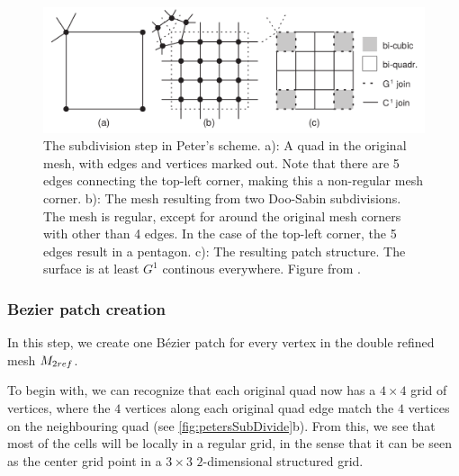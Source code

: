 \begin{figure}
	\centering
	\includegraphics[width = \textwidth]{Pictures/NURBS/petersQuad_to_patches.png}
	\caption{The subdivision step in Peter's scheme. a): A quad in the original mesh, with edges and vertices marked out. Note that there are 5 edges connecting the top-left corner, making this a non-regular mesh corner. b): The mesh resulting from two Doo-Sabin subdivisions. The mesh is regular, except for around the original mesh corners with other than 4 edges. In the case of the top-left corner, the 5 edges result in a pentagon. c): The resulting \Bez patch structure. The surface is at least $G^1$ continous everywhere. Figure from \cite{eck1996automatic}.}
	\label{fig:petersSubDivide}
\end{figure}


\subsubsection{Bezier patch creation}
In this step, we create one B{\'e}zier patch for every vertex in the double refined mesh $\petersControlMeshDobRef$. 

To begin with, we can recognize that each original quad now has a $4 \times 4$ grid of vertices, where the $4$ vertices along each original quad edge match the $4$ vertices on the neighbouring quad (see \autoref{fig:petersSubDivide}b). From this, we see that most of the cells will be locally in a regular grid, in the sense that it can be seen as the center grid point in a $3\times3$ $2$-dimensional structured grid.%

